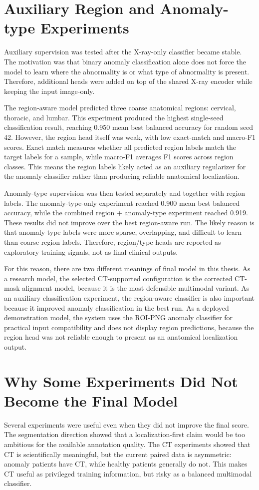 \section{Auxiliary Region and Anomaly-type Experiments}
Auxiliary supervision was tested after the X-ray-only classifier became stable. The motivation was that binary anomaly classification alone does not force the model to learn where the abnormality is or what type of abnormality is present. Therefore, additional heads were added on top of the shared X-ray encoder while keeping the input image-only.

The region-aware model predicted three coarse anatomical regions: cervical, thoracic, and lumbar. This experiment produced the highest single-seed classification result, reaching 0.950 mean best balanced accuracy for random seed 42. However, the region head itself was weak, with low exact-match and macro-F1 scores. Exact match measures whether all predicted region labels match the target labels for a sample, while macro-F1 averages F1 scores across region classes. This means the region labels likely acted as an auxiliary regularizer for the anomaly classifier rather than producing reliable anatomical localization.

Anomaly-type supervision was then tested separately and together with region labels. The anomaly-type-only experiment reached 0.900 mean best balanced accuracy, while the combined region + anomaly-type experiment reached 0.919. These results did not improve over the best region-aware run. The likely reason is that anomaly-type labels were more sparse, overlapping, and difficult to learn than coarse region labels. Therefore, region/type heads are reported as exploratory training signals, not as final clinical outputs.

For this reason, there are two different meanings of final model in this thesis. As a research model, the selected CT-supported configuration is the corrected CT-mask alignment model, because it is the most defensible multimodal variant. As an auxiliary classification experiment, the region-aware classifier is also important because it improved anomaly classification in the best run. As a deployed demonstration model, the system uses the ROI-PNG anomaly classifier for practical input compatibility and does not display region predictions, because the region head was not reliable enough to present as an anatomical localization output.

\section{Why Some Experiments Did Not Become the Final Model}
Several experiments were useful even when they did not improve the final score. The segmentation direction showed that a localization-first claim would be too ambitious for the available annotation quality. The CT experiments showed that CT is scientifically meaningful, but the current paired data is asymmetric: anomaly patients have CT, while healthy patients generally do not. This makes CT useful as privileged training information, but risky as a balanced multimodal classifier.

